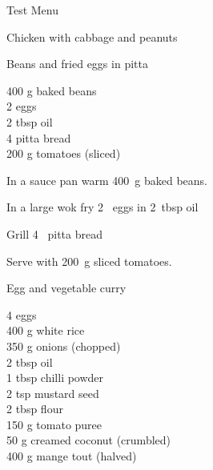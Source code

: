 \begin{menu}{Test Menu}
\begin{recipe}{2}{Chicken with cabbage and peanuts}
\begin{instructions}
    \end{instructions}
    \end{recipe}%
  
    \begin{recipe}{1}{Beans and fried eggs in pitta}%
    
		\begin{ingredients}
		400 g baked beans  \\
	2  eggs  \\
	2 tbsp oil  \\
	4  pitta bread  \\
	200 g tomatoes (sliced) \\
	
		\end{ingredients}
	
    \begin{instructions}
    \item 
        In a sauce pan warm
        400~g  baked beans.
      \item 
        In a large wok fry
        2~  eggs
        in
        2~tbsp  oil\item 
        Grill
        4~  pitta bread\item 
        Serve with 200~g sliced tomatoes.
      
    \end{instructions}
    \end{recipe}%
  
    \begin{recipe}{2}{Egg and vegetable curry}%
    
		\begin{ingredients}
		4  eggs  \\
	400 g white rice  \\
	350 g onions (chopped) \\
	2 tbsp oil  \\
	1 tbsp chilli powder  \\
	2 tsp mustard seed  \\
	2 tbsp flour  \\
	150 g tomato puree  \\
	50 g creamed coconut (crumbled) \\
	400 g mange tout (halved) \\
	
		\end{ingredients}
	
	

\end{recipe}
\end{menu}
